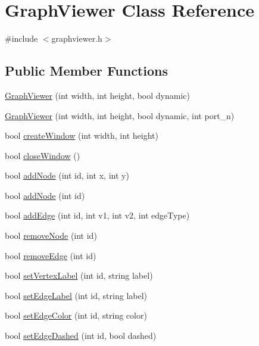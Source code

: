 \hypertarget{class_graph_viewer}{}\section{Graph\+Viewer Class Reference}
\label{class_graph_viewer}


{\ttfamily \#include $<$graphviewer.\+h$>$}

\subsection*{Public Member Functions}
\begin{DoxyCompactItemize}
\item 
\hyperlink{class_graph_viewer_a8adc614f4fc290a3efcec7d7ceb1c58a}{Graph\+Viewer} (int width, int height, bool dynamic)
\item 
\hyperlink{class_graph_viewer_ad9d7b1d8b4ba8ef18517eae0e68568a2}{Graph\+Viewer} (int width, int height, bool dynamic, int port\+\_\+n)
\item 
bool \hyperlink{class_graph_viewer_ae5247dc66449dcd21fc5d531bbbaddfa}{create\+Window} (int width, int height)
\item 
bool \hyperlink{class_graph_viewer_a85990c1eaac7feed3950960d4bd2fd4c}{close\+Window} ()
\item 
bool \hyperlink{class_graph_viewer_a5421e86ac76433876309236ba96e70a2}{add\+Node} (int id, int x, int y)
\item 
bool \hyperlink{class_graph_viewer_ab9be856eb5f45284719a3bb119ec01ea}{add\+Node} (int id)
\item 
bool \hyperlink{class_graph_viewer_aad0c1448c37f744209ffb671f1bd0015}{add\+Edge} (int id, int v1, int v2, int edge\+Type)
\item 
bool \hyperlink{class_graph_viewer_a0c418639bb911eb827cabf895915f775}{remove\+Node} (int id)
\item 
bool \hyperlink{class_graph_viewer_a9a8ee68c7c12b373affbe4069dd95d72}{remove\+Edge} (int id)
\item 
bool \hyperlink{class_graph_viewer_ac25d7d007022fda16799808ba136e909}{set\+Vertex\+Label} (int id, string label)
\item 
bool \hyperlink{class_graph_viewer_a447cca0064e785654c2105602c2961ca}{set\+Edge\+Label} (int id, string label)
\item 
bool \hyperlink{class_graph_viewer_a07ccc96707efae4aa5f3ced3dca015af}{set\+Edge\+Color} (int id, string color)
\item 
bool \hyperlink{class_graph_viewer_a1698f1c6b3a8e7cabc7b7d7cf42fc7f0}{set\+Edge\+Dashed} (int id, bool dashed)

\end{DoxyCompactItemize}
